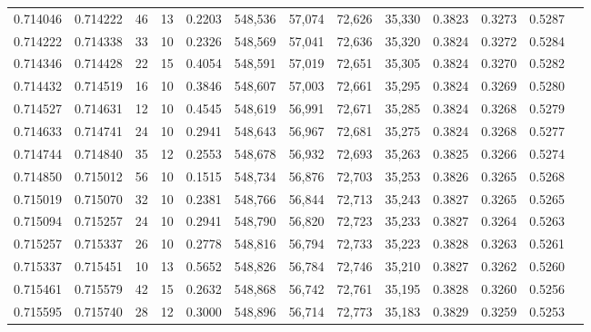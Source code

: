 \begin{tabular}{rrrrrrrrrrrrr}
0.714046 & 0.714222 &    46 &  13 &                                     0.2203 & 548,536 &  57,074 &  72,626 &  35,330 & 0.3823 & 0.3273 & 0.5287 \\
0.714222 & 0.714338 &    33 &  10 &                                     0.2326 & 548,569 &  57,041 &  72,636 &  35,320 & 0.3824 & 0.3272 & 0.5284 \\
0.714346 & 0.714428 &    22 &  15 &                                     0.4054 & 548,591 &  57,019 &  72,651 &  35,305 & 0.3824 & 0.3270 & 0.5282 \\
0.714432 & 0.714519 &    16 &  10 &                                     0.3846 & 548,607 &  57,003 &  72,661 &  35,295 & 0.3824 & 0.3269 & 0.5280 \\
0.714527 & 0.714631 &    12 &  10 &                                     0.4545 & 548,619 &  56,991 &  72,671 &  35,285 & 0.3824 & 0.3268 & 0.5279 \\
0.714633 & 0.714741 &    24 &  10 &                                     0.2941 & 548,643 &  56,967 &  72,681 &  35,275 & 0.3824 & 0.3268 & 0.5277 \\
0.714744 & 0.714840 &    35 &  12 &                                     0.2553 & 548,678 &  56,932 &  72,693 &  35,263 & 0.3825 & 0.3266 & 0.5274 \\
0.714850 & 0.715012 &    56 &  10 &                                     0.1515 & 548,734 &  56,876 &  72,703 &  35,253 & 0.3826 & 0.3265 & 0.5268 \\
0.715019 & 0.715070 &    32 &  10 &                                     0.2381 & 548,766 &  56,844 &  72,713 &  35,243 & 0.3827 & 0.3265 & 0.5265 \\
0.715094 & 0.715257 &    24 &  10 &                                     0.2941 & 548,790 &  56,820 &  72,723 &  35,233 & 0.3827 & 0.3264 & 0.5263 \\
0.715257 & 0.715337 &    26 &  10 &                                     0.2778 & 548,816 &  56,794 &  72,733 &  35,223 & 0.3828 & 0.3263 & 0.5261 \\
0.715337 & 0.715451 &    10 &  13 &                                     0.5652 & 548,826 &  56,784 &  72,746 &  35,210 & 0.3827 & 0.3262 & 0.5260 \\
0.715461 & 0.715579 &    42 &  15 &                                     0.2632 & 548,868 &  56,742 &  72,761 &  35,195 & 0.3828 & 0.3260 & 0.5256 \\
0.715595 & 0.715740 &    28 &  12 &                                     0.3000 & 548,896 &  56,714 &  72,773 &  35,183 & 0.3829 & 0.3259 & 0.5253 \\

\end{tabular}
